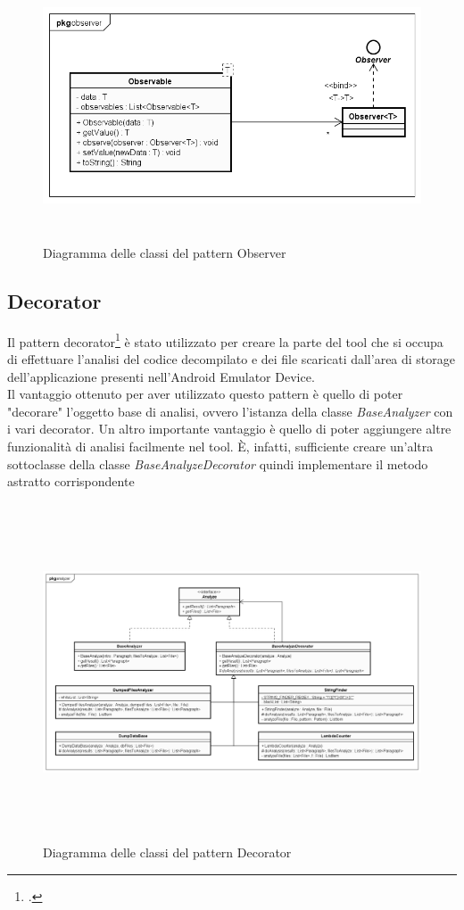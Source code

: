 \begin{figure}[H]
    \centering
    \includegraphics[width=14cm, height=8cm]{./immagini/diagrammi_uml/Observer.png}
    \caption{Diagramma delle classi del pattern Observer}\label{fig:observer}
\end{figure}

\newpage
\subsection{Decorator}\label{subsec:decorator}
Il pattern decorator\footcite{womak:decorator} è stato utilizzato per creare la parte del tool che si occupa
di effettuare l’analisi del codice decompilato e dei file scaricati dall’area di storage
dell’applicazione presenti nell’Android Emulator Device.\\
Il vantaggio ottenuto per aver utilizzato questo pattern è quello di poter "decorare" l’oggetto base di analisi, ovvero l’istanza della classe \textit{BaseAnalyzer} con i vari decorator.
Un altro importante vantaggio è quello di poter aggiungere altre funzionalità
di analisi facilmente nel tool.
È, infatti, sufficiente creare un’altra sottoclasse della classe \textit{BaseAnalyzeDecorator} quindi implementare il metodo astratto corrispondente

\begin{figure}[H]
    \centering
    \includegraphics[width=14cm, height=10cm]{./immagini/diagrammi_uml/Decorator.png}
    \caption{Diagramma delle classi del pattern Decorator}\label{fig:decorator}
\end{figure}

